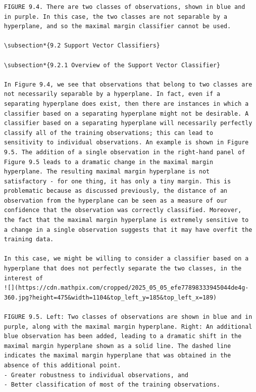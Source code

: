 \documentclass[10pt]{article}
\begin{document}
\begin{verbatim}
FIGURE 9.4. There are two classes of observations, shown in blue and in purple. In this case, the two classes are not separable by a hyperplane, and so the maximal margin classifier cannot be used.

\subsection*{9.2 Support Vector Classifiers}

\subsection*{9.2.1 Overview of the Support Vector Classifier}

In Figure 9.4, we see that observations that belong to two classes are not necessarily separable by a hyperplane. In fact, even if a separating hyperplane does exist, then there are instances in which a classifier based on a separating hyperplane might not be desirable. A classifier based on a separating hyperplane will necessarily perfectly classify all of the training observations; this can lead to sensitivity to individual observations. An example is shown in Figure 9.5. The addition of a single observation in the right-hand panel of Figure 9.5 leads to a dramatic change in the maximal margin hyperplane. The resulting maximal margin hyperplane is not satisfactory - for one thing, it has only a tiny margin. This is problematic because as discussed previously, the distance of an observation from the hyperplane can be seen as a measure of our confidence that the observation was correctly classified. Moreover, the fact that the maximal margin hyperplane is extremely sensitive to a change in a single observation suggests that it may have overfit the training data.

In this case, we might be willing to consider a classifier based on a hyperplane that does not perfectly separate the two classes, in the interest of
![](https://cdn.mathpix.com/cropped/2025_05_05_efe77898333945044de4g-360.jpg?height=475&width=1104&top_left_y=185&top_left_x=189)

FIGURE 9.5. Left: Two classes of observations are shown in blue and in purple, along with the maximal margin hyperplane. Right: An additional blue observation has been added, leading to a dramatic shift in the maximal margin hyperplane shown as a solid line. The dashed line indicates the maximal margin hyperplane that was obtained in the absence of this additional point.
- Greater robustness to individual observations, and
- Better classification of most of the training observations.


\end{verbatim}
\end{document}
